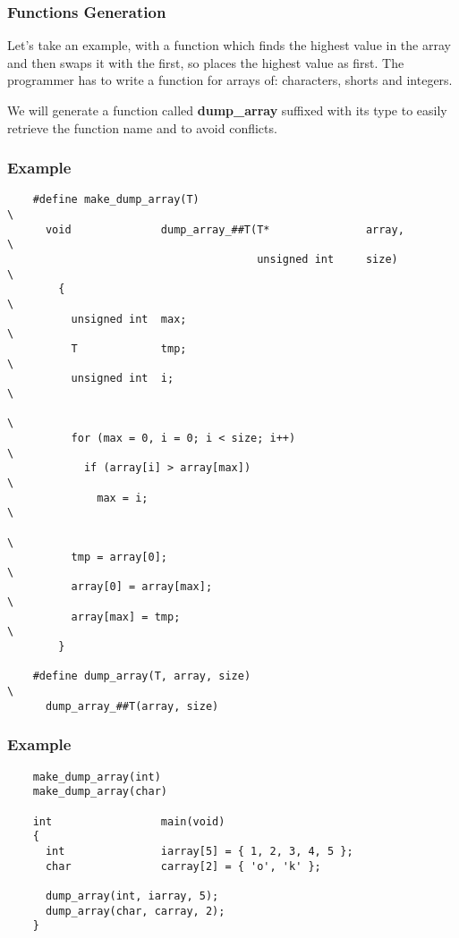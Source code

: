 \documentclass[8pt]{beamer}
\newcommand{\nl}[0]{\vspace{0.4cm}}
\begin{document}

\begin{frame}
  \frametitle{Functions Generation}

  Let's take an example, with a function which finds the highest value in
  the array and then swaps it with the first, so places the highest value
  as first. The programmer has to write a function for arrays of:
  characters, shorts and integers.

  \nl

  We will generate a function called \textbf{dump\_array} suffixed with
  its type to easily retrieve the function name and to avoid conflicts.
\end{frame}


\begin{frame}[containsverbatim]
  \frametitle{Example}

  \begin{verbatim}
    #define make_dump_array(T)                                          \
      void              dump_array_##T(T*               array,          \
                                       unsigned int     size)           \
        {                                                               \
          unsigned int  max;                                            \
          T             tmp;                                            \
          unsigned int  i;                                              \
                                                                        \
          for (max = 0, i = 0; i < size; i++)                           \
            if (array[i] > array[max])                                  \
              max = i;                                                  \
                                                                        \
          tmp = array[0];                                               \
          array[0] = array[max];                                        \
          array[max] = tmp;                                             \
        }

    #define dump_array(T, array, size)                                  \
      dump_array_##T(array, size)
  \end{verbatim}
\end{frame}


\begin{frame}[containsverbatim]
  \frametitle{Example}

  \begin{verbatim}
    make_dump_array(int)
    make_dump_array(char)

    int                 main(void)
    {
      int               iarray[5] = { 1, 2, 3, 4, 5 };
      char              carray[2] = { 'o', 'k' };

      dump_array(int, iarray, 5);
      dump_array(char, carray, 2);
    }
  \end{verbatim}
\end{frame}
\end{document}
